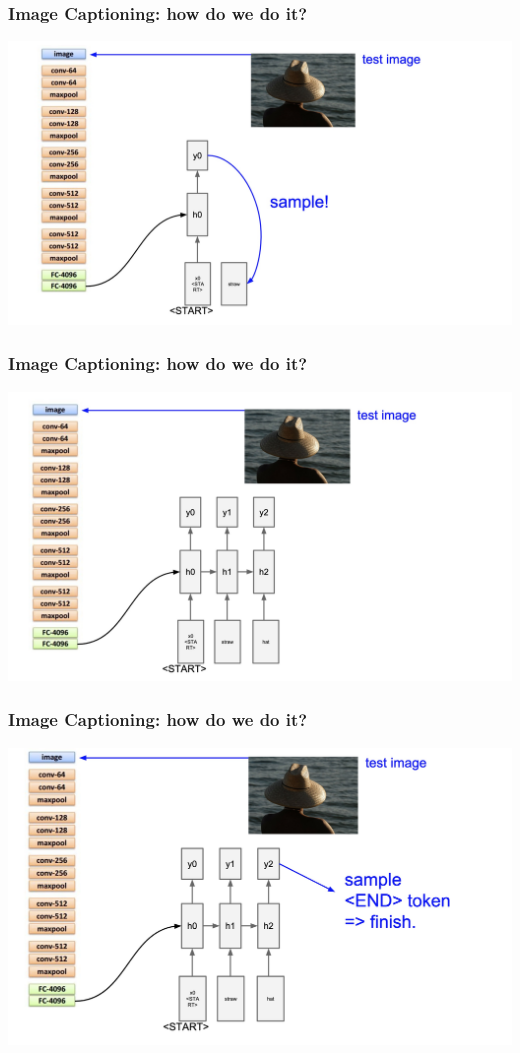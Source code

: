 \documentclass[aspectratio=1610]{beamer} %
\begin{document}
\begin{frame}
\frametitle{Image Captioning: how do we do it?}
\begin{center}
\includegraphics[width=.9\textwidth]{pics/cap6}
\end{center}
\end{frame}

\begin{frame}
\frametitle{Image Captioning: how do we do it?}
\begin{center}
\includegraphics[width=.9\textwidth]{pics/cap7}
\end{center}
\end{frame}

\begin{frame}
\frametitle{Image Captioning: how do we do it?}
\begin{center}
\includegraphics[width=.9\textwidth]{pics/cap8}
\end{center}
\end{frame}
\end{document}
